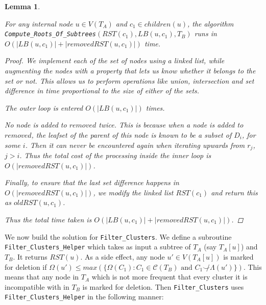 \documentclass{article}
\newcommand{\compatible}{\smile}
\newcommand{\leafset}{\Lambda}
\newtheorem{computerootsofsubtreesruntime}[incompatibility]{Lemma}
\begin{document}
    \begin{computerootsofsubtreesruntime}
        \label{lem:computerootsofsubtreesruntime}

        For any internal node $u \in V(T_A)$ and $c_1 \in children(u)$, the algorithm\\ %
        \texttt{Compute\_Roots\_Of\_Subtrees}$(RST(c_1), LB(u, c_1), T_B)$ runs in\\ %
        $O(|LB(u, c_1)| + |removedRST(u, c_1)|)$ time.

        \begin{proof}
            We implement each of the set of nodes using a linked list, while augmenting the nodes with a property that lets us know whether it belongs to the set or not. This allows us to perform operations like union, intersection and set difference in time proportional to the size of either of the sets.

            The outer loop is entered $O(|LB(u, c_1)|)$ times.

            No node is added to $removed$ twice. This is because when a node is added to $removed$, the leafset of the parent of this node is known to be a subset of $D_i$, for some $i$. Then it can never be encountered again when iterating upwards from $r_j$, $j > i$. Thus the total cost of the processing inside the inner loop is $O(|removedRST(u, c_1)|)$.

            Finally, to ensure that the last set difference happens in $O(|removedRST(u, c_1)|)$, we modify the linked list $RST(c_1)$ and return this as $oldRST(u, c_1)$.

            Thus the total time taken is $O(|LB(u, c_1)| + |removedRST(u, c_1)|)$.
        \end{proof}
    \end{computerootsofsubtreesruntime}

    We now build the solution for \texttt{Filter\_Clusters}. We define a subroutine \texttt{Filter\_Clusters\_Helper} which takes as input a subtree of $T_A$ (say $T_A[u]$) and $T_B$. It returns $RST(u)$. As a side effect, any node $u' \in V(T_A[u])$ is marked for deletion if $\Omega(u') \leq max(\{\Omega(C_1) : C_1 \in \mathcal{C}(T_B) \text{ and } C_1 \not\compatible \leafset(u')\})$. This means that any node in $T_A$ which is not more frequent that every cluster it is incompatible with in $T_B$ is marked for deletion. Then \texttt{Filter\_Clusters} uses \texttt{Filter\_Clusters\_Helper} in the following manner:
\end{document}
